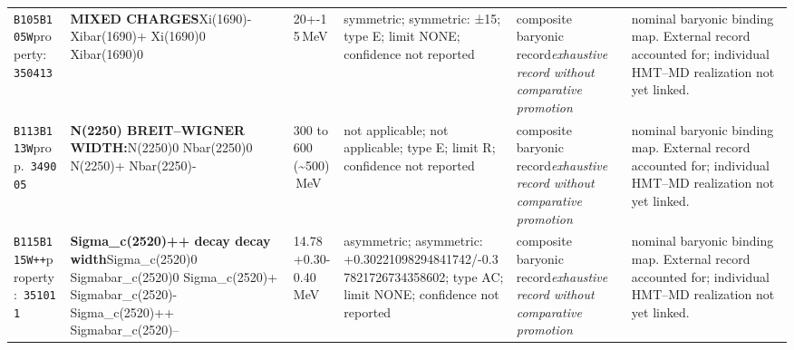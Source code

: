 \begin{landscape}
\begin{longtable}{L{1.85cm}L{4.45cm}L{2.35cm}L{4.05cm}L{3.35cm}L{7.15cm}}
\texttt{B105}\newline \texttt{B105W}\newline property:\ \texttt{350413} & \textbf{MIXED CHARGES}\newline Xi(1690)- \textbar{}\allowbreak{} Xibar(1690)+ \textbar{}\allowbreak{} Xi(1690)0 \textbar{}\allowbreak{} Xibar(1690)0 & 20+-15\,MeV & symmetric; symmetric: ±15; type E; limit NONE; confidence not reported & composite baryonic record\newline \emph{exhaustive record without comparative promotion} & nominal baryonic binding map. External record accounted for; individual HMT--MD realization not yet linked. \\
\texttt{B113}\newline \texttt{B113W}\newline prop.\ \texttt{349005} & \textbf{N(2250) BREIT--WIGNER WIDTH:}\newline N(2250)0 \textbar{}\allowbreak{} Nbar(2250)0 \textbar{}\allowbreak{} N(2250)+ \textbar{}\allowbreak{} Nbar(2250)- & 300 to 600 (\textasciitilde{}500)\,MeV & not applicable; not applicable; type E; limit R; confidence not reported & composite baryonic record\newline \emph{exhaustive record without comparative promotion} & nominal baryonic binding map. External record accounted for; individual HMT--MD realization not yet linked. \\
\texttt{B115}\newline \texttt{B115W++}\newline property:\ \texttt{351011} & \textbf{Sigma\_\allowbreak{}c(2520)++ decay decay width}\newline Sigma\_\allowbreak{}c(2520)0 \textbar{}\allowbreak{} Sigmabar\_\allowbreak{}c(2520)0 \textbar{}\allowbreak{} Sigma\_\allowbreak{}c(2520)+ \textbar{}\allowbreak{} Sigmabar\_\allowbreak{}c(2520)- \textbar{}\allowbreak{} Sigma\_\allowbreak{}c(2520)++ \textbar{}\allowbreak{} Sigmabar\_\allowbreak{}c(2520)-- & 14.78+0.30-0.40\,MeV & asymmetric; asymmetric: +0.30221098294841742/-0.37821726734358602; type AC; limit NONE; confidence not reported & composite baryonic record\newline \emph{exhaustive record without comparative promotion} & nominal baryonic binding map. External record accounted for; individual HMT--MD realization not yet linked. \\

\end{longtable}
\end{landscape}

